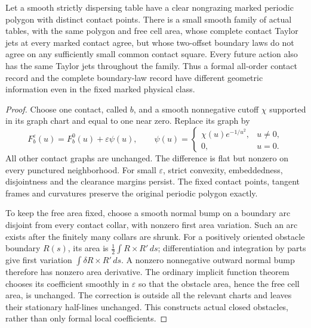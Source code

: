 \begin{proposition}
\label{prop:v68-flat-family}
Let a smooth strictly dispersing table have a clear nongrazing marked
periodic polygon with distinct contact points.  There is a small smooth
family of actual tables, with the same polygon and free cell area,
whose complete contact Taylor jets at every marked contact agree, but
whose two-offset boundary laws do not agree on any sufficiently small
common contact square.  Every future action also has the same Taylor jets throughout the
family.  Thus a formal all-order contact record and the complete
boundary-law record have different geometric information even in the
fixed marked physical class.
\end{proposition}
\begin{proof}
Choose one contact, called $b$, and a smooth nonnegative cutoff $\chi$
supported in its graph chart and equal to one near zero.  Replace its
graph by
\[
 F_b^\varepsilon(u)=F_b^0(u)+\varepsilon\psi(u),\qquad
 \psi(u)=\begin{cases}\chi(u)e^{-1/u^2},&u\ne0,\\0,&u=0.
             \end{cases}
\]
All other contact graphs are unchanged.  The difference is flat but
nonzero on every punctured neighborhood.  For small $\varepsilon$,
strict convexity, embeddedness, disjointness and the clearance margins
persist.  The fixed contact points, tangent frames and curvatures
preserve the original periodic polygon exactly.

To keep the free area fixed, choose a smooth normal bump on a boundary
arc disjoint from every contact collar, with nonzero first area
variation.  Such an arc exists after the finitely many collars are
shrunk.  For a positively oriented obstacle boundary $R(s)$, its area
is $\frac12\int R\mathbin\times R'\,ds$; differentiation and
integration by parts give first variation
$\int\delta R\mathbin\times R'\,ds$.  A nonzero nonnegative
outward normal bump therefore has nonzero area derivative.  The ordinary
implicit function theorem chooses its coefficient smoothly in
$\varepsilon$ so that the obstacle area, hence the free cell area, is
unchanged.  The correction is outside all the relevant charts and
leaves their stationary half-lines unchanged.  This constructs actual
closed obstacles, rather than only formal local coefficients.


\end{proof}
